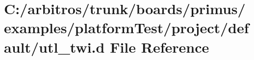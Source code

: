 \hypertarget{boards_2primus_2examples_2platform_test_2project_2default_2utl__twi_8d}{\section{C\-:/arbitros/trunk/boards/primus/examples/platform\-Test/project/default/utl\-\_\-twi.d File Reference}
\label{boards_2primus_2examples_2platform_test_2project_2default_2utl__twi_8d}
}
